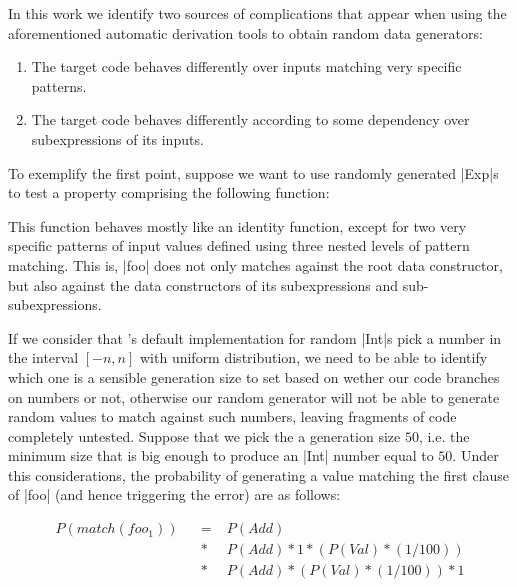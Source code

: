 In this work we identify two sources of complications that appear when using the
aforementioned automatic derivation tools to obtain random data generators:

\begin{enumerate}
\item The target code behaves differently over inputs matching very specific
  patterns.
\item The target code behaves differently according to some dependency over
  subexpressions of its inputs.
\end{enumerate}

To exemplify the first point, suppose we want to use randomly generated |Exp|s
to test a property comprising the following function:


This function behaves mostly like an identity function, except for two very
specific patterns of input values defined using three nested levels of pattern
matching.
%
This is, |foo| does not only matches against the root data constructor, but also
against the data constructors of its subexpressions and sub-subexpressions.

If we consider that \quickcheck's default implementation for random |Int|s pick
a number in the interval $[-n, n]$ with uniform distribution, we need to be able
to identify which one is a sensible generation size to set based on wether our
code branches on numbers or not, otherwise our random generator will not be able
to generate random values to match against such numbers, leaving fragments of
code completely untested.
%
Suppose that we pick the a generation size $50$, i.e. the minimum size that is
big enough to produce an |Int| number equal to $50$.
%
Under this considerations, the probability of generating a value matching the
first clause of |foo| (and hence triggering the error) are as follows:

\begin{align*}
  P(match(foo_1))
  \!&&=\; &P(Add) \\
  \!&&*\; &P(Add) * 1 * (P(Val) * (1/100)) \\
  \!&&*\; &P(Add) * (P(Val) * (1/100)) * 1
\end{align*}



